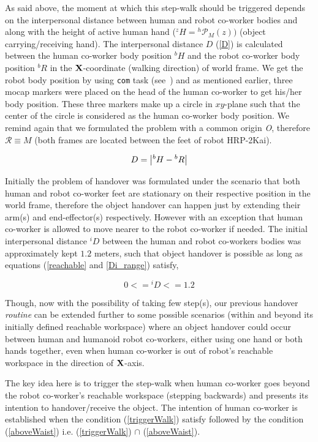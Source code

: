As said above, the moment at which this step-walk should be triggered depends on the interpersonal distance between human and robot co-worker bodies and along with the height of active human hand ($ {}^{z}H  = {}^{h}\mathcal{P}_M(z)) $ (object carrying/receiving hand). The interpersonal distance $ D $ (\ref{D}) is calculated between the human co-worker body position $ {}^{b}{H} $ and the robot co-worker body position $ {}^{b}{R} $ in the ${\bf X}$-coordinate (walking direction) of world frame. We get the robot body position by using \texttt{com} task (see~) and as mentioned earlier, three mocap markers were placed on the head of the human co-worker to get his/her body position. These three markers make up a circle in $xy$-plane such that the center of the circle is considered as the human co-worker body position. We remind again that we formulated the problem with a common origin {\it O}, therefore $\mathcal R \equiv M$ (both frames are located between the feet of robot HRP-2Kai).

\begin{equation}\label{D}
	D = \abs{{}^{b}{H} - {}^{b}{R}}
\end{equation}

Initially the problem of handover was formulated under the scenario that both human and robot co-worker feet are stationary on their respective position in the world frame, therefore the object handover can happen just by extending their arm(s) and end-effector(s) respectively. However with an exception that human co-worker is allowed to move nearer to the robot co-worker if needed. The initial interpersonal distance $ {}^{i}D $ between the human and robot co-workers bodies was approximately kept $1.2$ meters, such that object handover is possible as long as equations (\ref{reachable} and \ref{Di_range}) satisfy,

\begin{equation}\label{Di_range}
	0 <= {}^{i}D <= 1.2
\end{equation}


Though, now with the possibility of taking few step(s), our previous handover \textit{routine} can be extended further to some possible scenarios (within and beyond its initially defined reachable workspace) where an object handover could occur between human and humanoid robot co-workers, either using one hand or both hands together, even when human co-worker is out of robot's reachable workspace in the direction of $\bf{X}$-axis. 

The key idea here is to trigger the step-walk when human co-worker goes beyond the robot co-worker's reachable workspace (stepping backwards) and presents its intention to handover/receive the object. The intention of human co-worker is established when the condition (\ref{triggerWalk}) satisfy followed by the condition (\ref{aboveWaist}) i.e.  (\ref{triggerWalk}) $\cap$ (\ref{aboveWaist}).

